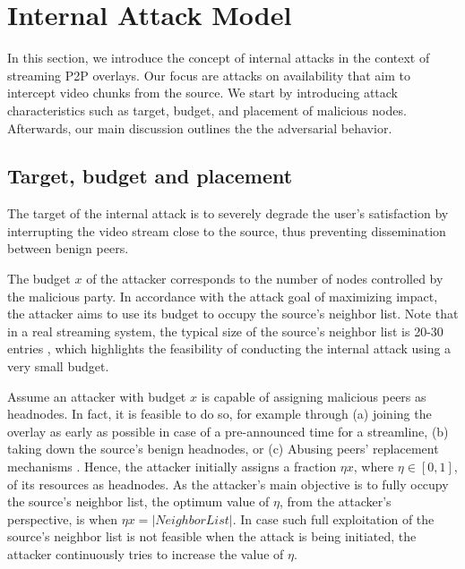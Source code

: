 \section{Internal Attack Model}
\label{sec:Attack}

In this section, we introduce the concept of internal attacks in the context of streaming P2P overlays.
Our focus are attacks on availability that aim to intercept video chunks from the source. 
We start by introducing attack characteristics such as target, budget, and placement of malicious nodes. 
Afterwards, our main discussion outlines the the \drop adversarial behavior. 

\subsection{Target, budget and placement}


The target of the internal attack is to severely degrade the user's satisfaction by interrupting the video stream close to the source, thus preventing dissemination between benign peers.

The budget $x$ of the attacker corresponds to the number of nodes controlled by the malicious party. 
In accordance with the attack goal of maximizing impact, the attacker aims to use its budget to occupy the source's neighbor list. 
Note that in a real streaming system, the typical size of the source's neighbor list is 20-30 entries  \cite{neighborlist1,neighborlist2}, which highlights the feasibility of conducting the internal attack using a very small budget.

Assume an attacker with budget $x$ is capable of assigning malicious peers as headnodes.
In fact, it is feasible to do so, for example through (a) joining the overlay as early as possible in case of a pre-announced time for a streamline, (b) taking down the source's benign headnodes, or (c) Abusing peers' replacement mechanisms \cite{nguyen2016swap}.
Hence, the attacker initially assigns a fraction $\eta x$, where $\eta\in [0,1]$, of its resources as headnodes.
As the attacker's main objective is to fully occupy the source's neighbor list, the optimum value of $\eta$, from the attacker's perspective, is when $\eta x = |NeighborList|$.
In case such full exploitation of the source's neighbor list is not feasible when the attack is being initiated, the attacker continuously tries to increase the value of $\eta$.  

